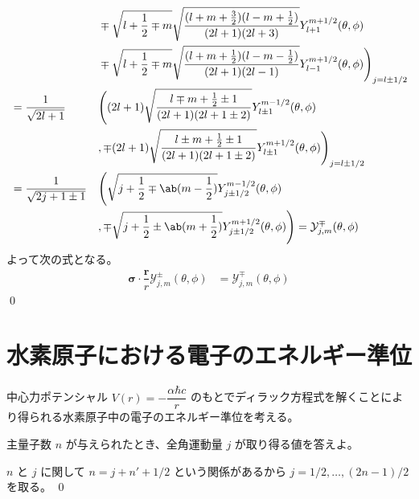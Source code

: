 \documentclass[uplatex,dvipdfmx,a4paper,11pt]{jlreq}
\makeatletter
\newcommand{\rr}{\bm{r}}
\numberwithin{equation}{section}
\theoremstyle{definition}
\renewenvironment{proof}[1][\proofname]{\par
  \normalfont
  \topsep6\p@\@plus6\p@ \trivlist
  \item[\hskip\labelsep{\bfseries #1}\@addpunct{\bfseries}]\ignorespaces\quad\par
}{%
  \qed\endtrivlist\@endpefalse
}
\renewcommand\proofname{証明}
\makeatother
\begin{document}
\begin{proof}
\begin{alignat}{3}
                                                                       &                                 &  & \mp\sqrt{l + \frac{1}{2} \mp m}\sqrt{\frac{(l + m + \frac{3}{2})(l - m + \frac{1}{2})}{(2l + 1)(2l + 3)}}Y_{l+1}^{m+1/2}(\theta, \phi)                                   \\
                                                                       &                                 &  & \mp\sqrt{l + \frac{1}{2} \mp m}\sqrt{\frac{(l + m + \frac{1}{2})(l - m - \frac{1}{2})}{(2l + 1)(2l - 1)}}Y_{l-1}^{m+1/2}(\theta, \phi)\Bigg)_{j = l\pm 1/2}              \\
                                                                       & = \frac{1}{\sqrt{2l + 1}}       &  & \Bigg((2l + 1)\sqrt{\frac{l \mp m + \frac{1}{2} \pm 1}{(2l + 1)(2l + 1 \pm 2)}}Y_{l\pm 1}^{m-1/2}(\theta, \phi)                                                          \\
                                                                       &                                 &  & ,\mp(2l + 1)\sqrt{\frac{l \pm m + \frac{1}{2} \pm 1}{(2l + 1)(2l + 1 \pm 2)}}Y_{l\pm 1}^{m+1/2}(\theta, \phi)\Bigg)_{j = l\pm 1/2}                                       \\
                                                                       & = \frac{1}{\sqrt{2j + 1 \pm 1}} &  & \Bigg(\sqrt{j + \frac{1}{2} \mp \ab(m - \frac{1}{2})}Y_{j\pm 1/2}^{m-1/2}(\theta, \phi)                                                                                  \\
                                                                       &                                 &  & ,\mp\sqrt{j + \frac{1}{2} \pm \ab(m + \frac{1}{2})}Y_{j\pm 1/2}^{m+1/2}(\theta, \phi)\Bigg) = \mathcal{Y}_{j, m}^\mp(\theta, \phi)
  \end{alignat}
  よって次の式となる。
  \begin{align}
    \bm{\sigma}\cdot\dfrac{\rr}{r}\mathcal{Y}_{j, m}^\pm(\theta, \phi) & = \mathcal{Y}_{j, m}^\mp(\theta, \phi)
  \end{align}
\end{proof}

\section{水素原子における電子のエネルギー準位}
\begin{problem}
中心力ポテンシャル $V(r) = -\dfrac{\alpha\hbar c}{r}$ のもとでディラック方程式を解くことにより得られる水素原子中の電子のエネルギー準位を考える。

主量子数 $n$ が与えられたとき、全角運動量 $j$ が取り得る値を答えよ。
\end{problem}
\begin{proof}
  $n$ と $j$ に関して $n = j + n' + 1/2$ という関係があるから $j = 1/2,\ldots,(2n-1)/2$ を取る。
\end{proof}
\end{document}
